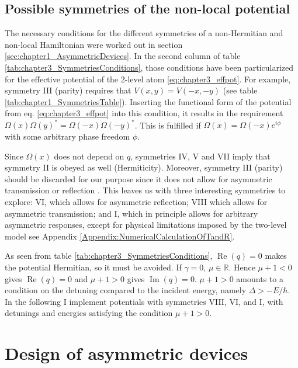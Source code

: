 \subsection{Possible symmetries of the non-local potential}
%
The necessary conditions for the different symmetries of a non-Hermitian and non-local Hamiltonian were worked out in section \ref{sec:chapter1_AsymmetricDevices}. In the second column of table \ref{tab:chapter3_SymmetriesConditions}, those conditions have been particularized for the effective potential of the 2-level atom \eqref{eq:chapter3_effpot}. For example, symmetry III (parity) requires that $V(x,y)=V(-x,-y)$ (see table \ref{tab:chapter1_SymmetriesTable}). Inserting the functional form of the potential from eq. \eqref{eq:chapter3_effpot} into this condition, it results in the requirement $\Omega(x) \Omega(y)^* = \Omega(-x) \Omega(-y)^*$. This is fulfilled if $\Omega(x)=\Omega(-x)e^{i \phi}$ with some arbitrary phase freedom $\phi$.

Since $\Omega(x)$ does not depend on $q$, symmetries IV, V and VII imply that symmetry II is obeyed as well (Hermiticity).
Moreover, symmetry III (parity) should be discarded for our purpose since it does not allow for asymmetric transmission or reflection
\cite{Ruschhaupt2017}.
This leaves us with three interesting symmetries to explore:
VI, which allows for  asymmetric reflection; VIII which allows for asymmetric transmission; and  I,
which in principle allows for arbitrary asymmetric responses, except for physical limitations imposed by
the two-level model see Appendix \ref{Appendix:NumericalCalculationOfTandR}.

As seen from  table \ref{tab:chapter3_SymmetriesConditions}, $\operatorname{Re}(q)=0$ makes the potential Hermitian, so it must be avoided.
If $\gamma=0$,   $\mu \in \mathbb{R}$. Hence $\mu+1<0$ gives $\operatorname{Re}(q)=0$ and $\mu+1>0$ gives
$\operatorname{Im}(q)=0$. $\mu+1>0$ amounts to a condition on the detuning compared to the incident energy, namely $\Delta>-E/\hbar$.
In the following I implement potentials with symmetries VIII, VI, and I, with detunings and energies satisfying the condition $\mu+1>0$.


\section{Design of asymmetric devices\label{sec:chapter3_exa}}

